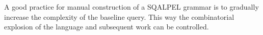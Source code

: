 \documentclass{cidr-2019}
\begin{document}


A good practice for manual construction of a {\sc SQALPEL} grammar is
to gradually increase the complexity of the baseline query. This way
the combinatorial explosion of the language and subsequent work can be
controlled.

%
\end{document}
